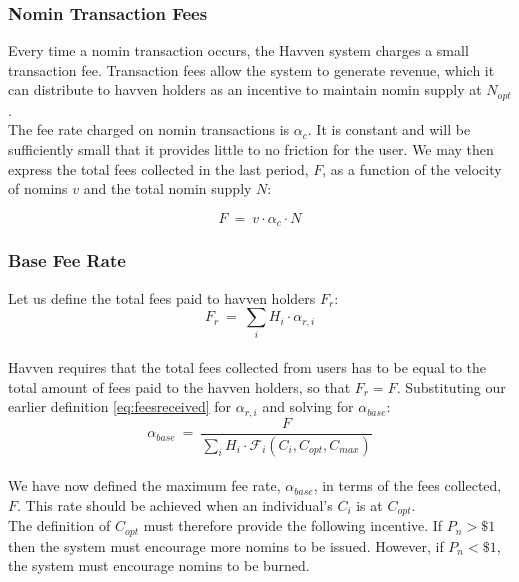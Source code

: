 \newpage

\subsubsection{Nomin Transaction Fees}
Every time a nomin transaction occurs, the Havven system charges a small
transaction fee. Transaction fees allow the system to generate revenue, which
it can distribute to havven holders as an incentive to maintain nomin supply
at $N_{opt}$. \\

\noindent The fee rate charged on nomin transactions is $\alpha_c$. It is
constant and will be sufficiently small that it provides little to no
friction for the user. We may then express the total fees collected in the
last period, $F$, as a function of the velocity of nomins $v$ and the total
nomin supply $N$:

\begin{equation}
    F \ = \ v \cdot \alpha_c \cdot N
\end{equation}

\subsubsection{Base Fee Rate}

Let us define the total fees paid to havven holders $F_{r}$: \\

\begin{equation}
F_{r} \ = \ \sum_{i} H_{i} \cdot \alpha_{r,i} \label{eq:totalfeesreceived}
\end{equation} \\

\noindent Havven requires that the total fees collected from users has to be
equal to the total amount of fees paid to the havven holders, so that $F_{r}
= F$. Substituting our earlier definition \eqref{eq:feesreceived} for
$\alpha_{r,i}$ and solving for $\alpha_{base} $: \\

\begin{equation}
\alpha_{base} \ = \ \frac{F}{\sum_{i} H_{i} \cdot \mathcal{F}_{i}(C_{i}, C_{opt}, C_{max})} \label{eq:10}
\end{equation} \\

\noindent We have now defined the maximum fee rate, $\alpha_{base}$, in terms
of the fees collected, $F$. This rate should be achieved when an individual's
$C_i$ is at $C_{opt}$. \\

\noindent The definition of $C_{opt}$ must therefore provide the following
incentive. If $P_n > \$1$ then the system must encourage more nomins to be
issued. However, if $P_n < \$1$, the system must encourage nomins to be
burned.
